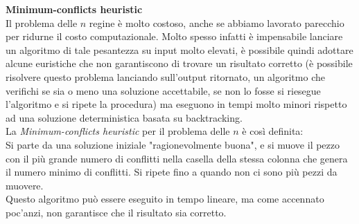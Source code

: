 \documentclass[../cheatSheetAlgoritmi.tex]{subfiles}
\begin{document}
\bigskip
\textbf{Minimum-conflicts heuristic} \\
Il problema delle $n$ regine è molto costoso, anche se abbiamo lavorato parecchio per ridurne il costo computazionale. Molto spesso infatti è impensabile lanciare un algoritmo di tale pesantezza su input molto elevati, è possibile quindi adottare alcune euristiche che non garantiscono di trovare un risultato corretto (è possibile risolvere questo problema lanciando sull'output ritornato, un algoritmo che verifichi se sia o meno una soluzione accettabile, se non lo fosse si riesegue l'algoritmo e si ripete la procedura) ma eseguono in tempi molto minori rispetto ad una soluzione deterministica basata su backtracking. \\
La \emph{Minimum-conflicts heuristic} per il problema delle $n$ è così definita: \\
Si parte da una soluzione iniziale "ragionevolmente buona", e si muove il pezzo con il più grande numero di conflitti nella casella della stessa colonna che genera il numero minimo di conflitti. Si ripete fino a quando non ci sono più pezzi da muovere. \\
Questo algoritmo può essere eseguito in tempo lineare, ma come accennato poc'anzi, non garantisce che il risultato sia corretto.
\end{document}
